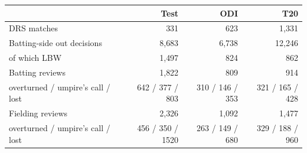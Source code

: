 \begin{tabular}{lrrr}
\toprule
 & Test & ODI & T20 \\
\midrule
DRS matches & 331 & 623 & 1{,}331 \\
Batting-side out decisions & 8{,}683 & 6{,}738 & 12{,}246 \\
\quad of which LBW & 1{,}497 & 824 & 862 \\
Batting reviews & 1{,}822 & 809 & 914 \\
\quad overturned / umpire's call / lost & 642 / 377 / 803 & 310 / 146 / 353 & 321 / 165 / 428 \\
Fielding reviews & 2{,}326 & 1{,}092 & 1{,}477 \\
\quad overturned / umpire's call / lost & 456 / 350 / 1520 & 263 / 149 / 680 & 329 / 188 / 960 \\
\bottomrule
\end{tabular}
